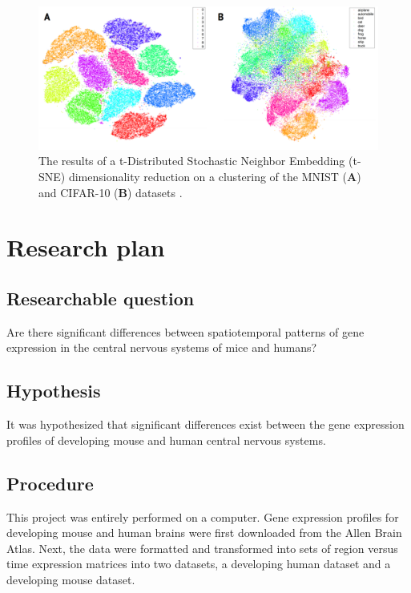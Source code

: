 \documentclass[12pt,oneside,onecolumn,a4paper]{article}
\begin{document}
\begin{figure}[H]
\begin{center}
\includegraphics[width=0.8\columnwidth]{figures/tsne}
\caption{The results of a t-Distributed Stochastic Neighbor Embedding (t-SNE) dimensionality reduction on a clustering of the MNIST (\textbf{A}) and CIFAR-10 (\textbf{B}) datasets \citep{laurensvandermaaten2014}. \label{fig:clusters}%
}
\end{center}
\end{figure}

\section{Research plan}


\subsection{Researchable question}
Are there significant differences between spatiotemporal patterns of gene expression in the central nervous systems of mice and humans?

\subsection{Hypothesis}

It was hypothesized that significant differences exist between the gene expression profiles of developing mouse and human central nervous systems.

\subsection{Procedure}
This project was entirely performed on a computer. Gene expression profiles for developing mouse and human brains were first downloaded from the Allen Brain Atlas. Next, the data were formatted and transformed into sets of region versus time expression matrices into two datasets, a developing human dataset and a developing mouse dataset. 
\end{document}
